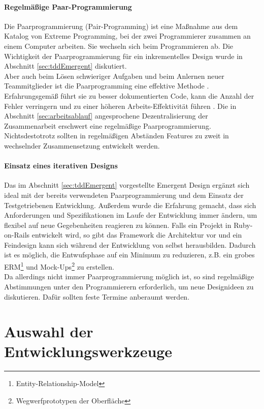 \paragraph{Regelmäßige Paar-Programmierung} Die Paarprogrammierung (Pair-Programming) ist eine Maßnahme aus dem Katalog von Extreme Programming, bei der zwei Programmierer zusammen an einem Computer arbeiten. Sie wechseln sich beim Programmieren ab. Die Wichtigkeit der Paarprogrammierung für ein inkrementelles Design wurde in Abschnitt \ref{sec:tddEmergent} diskutiert.\\ Aber auch beim Lösen schwieriger Aufgaben und beim Anlernen neuer Teammitglieder ist die Paarprogramming eine effektive Methode \citep[S. 9]{hulkko_multiple_2005}. Erfahrungsgemäß führt sie zu besser dokumentierten Code, kann die Anzahl der Fehler verringern und zu einer höheren Arbeits-Effektivität führen \citep{hulkko_multiple_2005}.
Die in Abschnitt \ref{sec:arbeitsablauf} angesprochene Dezentralisierung der Zusammenarbeit erschwert eine regelmäßige Paarprogrammierung. Nichtsdestotrotz sollten in regelmäßigen Abständen Features zu zweit in wechselnder Zusammensetzung entwickelt werden.

\paragraph{Einsatz eines iterativen Designs} Das im Abschnitt \ref{sec:tddEmergent} vorgestellte Emergent Design ergänzt sich ideal mit der bereits verwendeten Paarprogrammierung und dem Einsatz der Testgetriebenen Entwicklung. Außerdem wurde die Erfahrung gemacht, dass sich Anforderungen und Spezifikationen im Laufe der Entwicklung immer ändern, um flexibel auf neue Gegebenheiten reagieren zu können. Falls ein Projekt in Ruby-on-Rails entwickelt wird, so gibt das Framework die Architektur vor und ein Feindesign kann sich während der Entwicklung von selbst herausbilden. Dadurch ist es möglich, die Entwufsphase auf ein Minimum zu reduzieren, z.B. ein grobes ERM\footnote{Entity-Relationship-Model} und Mock-Ups\footnote{Wegwerfprototypen der Oberfläche} zu erstellen.\\
Da allerdings nicht immer Paarprogrammierung möglich ist, so sind regelmäßige Abstimmungen unter den Programmierern erforderlich, um neue Designideen zu diskutieren. Dafür sollten feste Termine anberaumt werden.


\section{Auswahl der Entwicklungswerkzeuge}
\label{sec:devtools}

